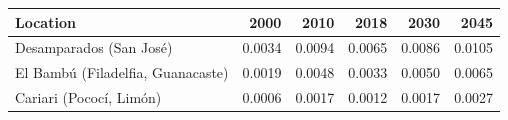 \begin{table}[htbp]
\centering
{}
\label{tab:location_prob_cr}
\small
\begin{tabular}{lrrrrr}
\toprule
\textbf{Location} & \textbf{2000} & \textbf{2010} & \textbf{2018} & \textbf{2030} & \textbf{2045} \\
\midrule
Desamparados (San Jos\'{e}) & 0.0034 & 0.0094 & 0.0065 & 0.0086 & 0.0105 \\
El Bamb\'{u} (Filadelfia, Guanacaste) & 0.0019 & 0.0048 & 0.0033 & 0.0050 & 0.0065 \\
Cariari (Pococ\'{i}, Lim\'{o}n) & 0.0006 & 0.0017 & 0.0012 & 0.0017 & 0.0027 \\
\bottomrule
\end{tabular}
\end{table}
